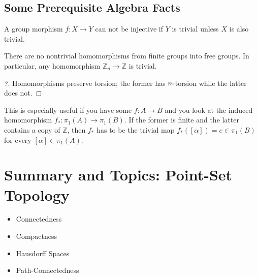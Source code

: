 \hypertarget{some-prerequisite-algebra-facts}{%
\subsection{Some Prerequisite Algebra
Facts}\label{some-prerequisite-algebra-facts}}

\begin{fact}

A group morphism \(f:X \to Y\) can not be injective if \(Y\) is trivial
unless \(X\) is also trivial.

\end{fact}

\begin{proposition}

There are no nontrivial homomorphisms from finite groups into free
groups. In particular, any homomorphism
\({\mathbb{Z}}_n \to {\mathbb{Z}}\) is trivial.

\end{proposition}

\begin{proof}[?]

Homomorphisms preserve torsion; the former has \(n{\hbox{-}}\)torsion
while the latter does not.

\end{proof}

\begin{remark}

This is especially useful if you have some \(f: A\to B\) and you look at
the induced homomorphism \(f_*: \pi_1(A) \to\pi_1(B)\). If the former is
finite and the latter contains a copy of \({\mathbb{Z}}\), then \(f_*\)
has to be the trivial map \(f_*([\alpha]) = e \in \pi_1(B)\) for every
\([\alpha] \in \pi_1(A)\).

\end{remark}

\hypertarget{summary-and-topics-point-set-topology}{%
\section{Summary and Topics: Point-Set
Topology}\label{summary-and-topics-point-set-topology}}

\begin{itemize}
\tightlist
\item
  Connectedness
\item
  Compactness
\item
  Hausdorff Spaces
\item
  Path-Connectedness
\end{itemize}


